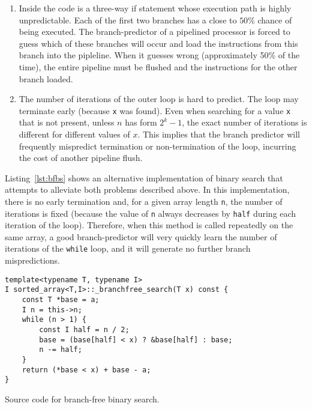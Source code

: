 \documentclass{patmorin}
\newcommand{\lstlabel}[1]{\label{lst:#1}}
\newcommand{\lstref}[1]{Listing~\ref{lst:#1}}
\newcommand{\Lstref}[1]{\lstref{#1}}
\begin{document}
\begin{enumerate}

\item Inside the code is a three-way if statement whose execution path
is highly unpredictable. Each of the first two branches has a close to
$50\%$ chance of being executed.  The branch-predictor of a pipelined
processor is forced to guess which of these branches will occur and load
the instructions from this branch into the pipleline.  When it guesses
wrong (approximately 50\% of the time), the entire pipeline must be
flushed and the instructions for the other branch loaded.

\item The number of iterations of the outer loop is hard to predict. The
loop may terminate early (because \texttt{x} was found). Even when
searching for a value \texttt{x} that is not present, unless $n$ has
form $2^k-1$, the exact number of iterations is different for different
values of $x$.  This implies that the branch predictor will frequently
mispredict termination or non-termination of the loop, incurring the
cost of another pipeline flush.

\end{enumerate}

\Lstref{bfbs} shows an alternative implementation of binary search
that attempts to alleviate both problems described above.  In this
implementation, there is no early termination and, for a given array
length \texttt{n}, the number of iterations is fixed (because the
value of \texttt{n} always decreases by \texttt{half}
during each iteration of the loop).  Therefore, when this method is
called repeatedly on the same array, a good branch-predictor will very
quickly learn the number of iterations of the \texttt{while}
loop, and it will generate no further branch mispredictions.

\begin{listing}
\begin{verbatim}
template<typename T, typename I>
I sorted_array<T,I>::_branchfree_search(T x) const {
    const T *base = a;
    I n = this->n;
    while (n > 1) {
        const I half = n / 2;
        base = (base[half] < x) ? &base[half] : base;
        n -= half;
    }
    return (*base < x) + base - a;
}
\end{verbatim}
\caption{Source code for branch-free binary search.}
\lstlabel{bfbs}
\end{listing}
\end{document}
